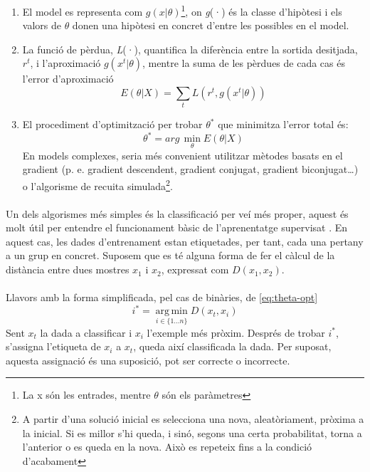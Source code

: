 \documentclass[12pt,a4paper,final,twoside]{article}
\begin{document}
\begin{enumerate}

\item El model es representa com $g(x|\theta)$\footnote{La x són les entrades, mentre $\theta$ són els paràmetres}, on \textit{g}(·) és la classe d'hipòtesi i els valors de $\theta$ donen una hipòtesi en concret d'entre les possibles en el model.

\item La funció de pèrdua, \textit{L}(·), quantifica la diferència entre la sortida desitjada, $r^t$, i l'aproximació $g(x^t|\theta)$, mentre la suma de les pèrdues de cada cas és l'error d'aproximació \begin{equation} \label{eq:er-aprox}
E(\theta|X)=\sum_{t} L(r^t,g(x^t|\theta))
\end{equation}

\item El procediment d'optimització per trobar $\theta^*$ que minimitza l'error total és:
\begin{equation} \label{eq:theta-opt}
\theta^*=arg\,\operatorname*{min}_\theta E(\theta|X)
\end{equation}
En models complexes, seria més convenient utilitzar mètodes basats en el gradient (p. e. gradient descendent, gradient conjugat, gradient biconjugat\dots) o l'algorisme de recuita simulada\footnote{A partir d'una solució inicial es selecciona una nova, aleatòriament, pròxima a la inicial. Si es millor s'hi queda, i sinó, segons una certa probabilitat, torna a l'anterior o es queda en la nova. Això es repeteix fins a la condició d'acabament\cite{Torrent-Fontbona2013}}.

\end{enumerate}

\paragraph{}Un dels algorismes més simples és la classificació per veí més proper, aquest és molt útil per entendre el funcionament bàsic de l'aprenentatge supervisat \cite{Learned-Miller2014}. En aquest cas, les dades d'entrenament estan etiquetades, per tant, cada una pertany a un grup en concret. Suposem que es té alguna forma de fer el càlcul de la distància entre dues mostres $x_{1}$ i $x_{2}$, expressat com $D(x_{1}, x_{2})$.

\paragraph{}Llavors amb la forma simplificada, pel cas de binàries, de \eqref{eq:theta-opt}
\begin{equation} \label{eq:theta-opt-exemple}
i^*=\operatorname*{arg\,min}_{i\in\{1\dots n\}} D(x_{t}, x_{i})
\end{equation}
Sent $x_{t}$ la dada a classificar i $x_{i}$ l'exemple més pròxim. Després de trobar $i^*$, s'assigna l'etiqueta de $x_{i}$ a $x_{t}$, queda així classificada la dada. Per suposat, aquesta assignació és una suposició, pot ser correcte o incorrecte.
\end{document}
